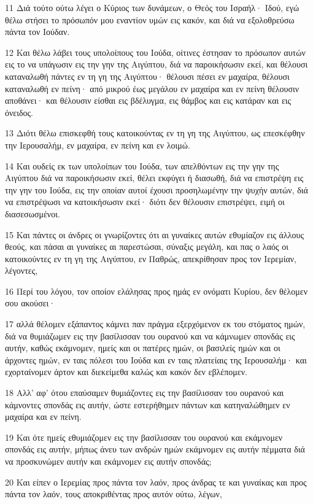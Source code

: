 \par 11 Διά τούτο ούτω λέγει ο Κύριος των δυνάμεων, ο Θεός του Ισραήλ· Ιδού, εγώ θέλω στήσει το πρόσωπόν μου εναντίον υμών εις κακόν, και διά να εξολοθρεύσω πάντα τον Ιούδαν.
\par 12 Και θέλω λάβει τους υπολοίπους του Ιούδα, οίτινες έστησαν το πρόσωπον αυτών εις το να υπάγωσιν εις την γην της Αιγύπτου, διά να παροικήσωσιν εκεί, και θέλουσι καταναλωθή πάντες εν τη γη της Αιγύπτου· θέλουσι πέσει εν μαχαίρα, θέλουσι καταναλωθή εν πείνη· από μικρού έως μεγάλου εν μαχαίρα και εν πείνη θέλουσιν αποθάνει· και θέλουσιν είσθαι εις βδέλυγμα, εις θάμβος και εις κατάραν και εις όνειδος.
\par 13 Διότι θέλω επισκεφθή τους κατοικούντας εν τη γη της Αιγύπτου, ως επεσκέφθην την Ιερουσαλήμ, εν μαχαίρα, εν πείνη και εν λοιμώ.
\par 14 Και ουδείς εκ των υπολοίπων του Ιούδα, των απελθόντων εις την γην της Αιγύπτου διά να παροικήσωσιν εκεί, θέλει εκφύγει ή διασωθή, διά να επιστρέψη εις την γην του Ιούδα, εις την οποίαν αυτοί έχουσι προσηλωμένην την ψυχήν αυτών, διά να επιστρέψωσι να κατοικήσωσιν εκεί· διότι δεν θέλουσιν επιστρέψει, ειμή οι διασεσωσμένοι.
\par 15 Και πάντες οι άνδρες οι γνωρίζοντες ότι αι γυναίκες αυτών εθυμίαζον εις άλλους θεούς, και πάσαι αι γυναίκες αι παρεστώσαι, σύναξις μεγάλη, και πας ο λαός οι κατοικούντες εν τη γη της Αιγύπτου, εν Παθρώς, απεκρίθησαν προς τον Ιερεμίαν, λέγοντες,
\par 16 Περί του λόγου, τον οποίον ελάλησας προς ημάς εν ονόματι Κυρίου, δεν θέλομεν σου ακούσει·
\par 17 αλλά θέλομεν εξάπαντος κάμνει παν πράγμα εξερχόμενον εκ του στόματος ημών, διά να θυμιάζωμεν εις την βασίλισσαν του ουρανού και να κάμνωμεν σπονδάς εις αυτήν, καθώς εκάμνομεν, ημείς και οι πατέρες ημών, οι βασιλείς ημών και οι άρχοντες ημών, εν ταις πόλεσι του Ιούδα και εν ταις πλατείαις της Ιερουσαλήμ· και εχορταίνομεν άρτον και διεκείμεθα καλώς και κακόν δεν εβλέπομεν.
\par 18 Αλλ' αφ' ότου επαύσαμεν θυμιάζοντες εις την βασίλισσαν του ουρανού και κάμνοντες σπονδάς εις αυτήν, ώστε εστερήθημεν πάντων και κατηναλώθημεν εν μαχαίρα και εν πείνη.
\par 19 Και ότε ημείς εθυμιάζομεν εις την βασίλισσαν του ουρανού και εκάμνομεν σπονδάς εις αυτήν, μήπως άνευ των ανδρών ημών εκάμνομεν εις αυτήν πέμματα διά να προσκυνώμεν αυτήν και εκάμνομεν εις αυτήν σπονδάς;
\par 20 Και είπεν ο Ιερεμίας προς πάντα τον λαόν, προς άνδρας τε και γυναίκας και προς πάντα τον λαόν, τους αποκριθέντας προς αυτόν ούτω, λέγων,
